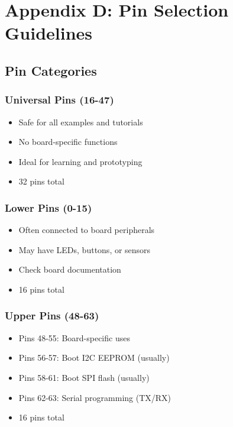 \documentclass[11pt]{book}
\providecommand{\tightlist}{%
  \setlength{\itemsep}{0pt}\setlength{\parskip}{0pt}}
\begin{document}
\hypertarget{appendix-d-pin-selection-guidelines}{%
\section{Appendix D: Pin Selection
Guidelines}\label{appendix-d-pin-selection-guidelines}}

\hypertarget{pin-categories}{%
\subsection{Pin Categories}\label{pin-categories}}

\hypertarget{universal-pins-16-47}{%
\subsubsection{Universal Pins (16-47)}\label{universal-pins-16-47}}

\begin{itemize}
\tightlist
\item
  Safe for all examples and tutorials
\item
  No board-specific functions
\item
  Ideal for learning and prototyping
\item
  32 pins total
\end{itemize}

\hypertarget{lower-pins-0-15}{%
\subsubsection{Lower Pins (0-15)}\label{lower-pins-0-15}}

\begin{itemize}
\tightlist
\item
  Often connected to board peripherals
\item
  May have LEDs, buttons, or sensors
\item
  Check board documentation
\item
  16 pins total
\end{itemize}

\hypertarget{upper-pins-48-63}{%
\subsubsection{Upper Pins (48-63)}\label{upper-pins-48-63}}

\begin{itemize}
\tightlist
\item
  Pins 48-55: Board-specific uses
\item
  Pins 56-57: Boot I2C EEPROM (usually)
\item
  Pins 58-61: Boot SPI flash (usually)
\item
  Pins 62-63: Serial programming (TX/RX)
\item
  16 pins total
\end{itemize}
\end{document}
